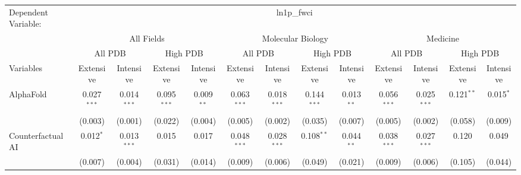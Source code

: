 \begingroup
\centering
\begin{tabular}{lcccccccccccc}
   \tabularnewline \midrule \midrule
   Dependent Variable: & \multicolumn{12}{c}{ln1p\_fwci}\\
 & \multicolumn{4}{c}{All Fields} & \multicolumn{4}{c}{Molecular Biology} & \multicolumn{4}{c}{Medicine} \\
\cmidrule(lr){2-5} \cmidrule(lr){6-9} \cmidrule(lr){10-13}
 & \multicolumn{2}{c}{All PDB} & \multicolumn{2}{c}{High PDB} & \multicolumn{2}{c}{All PDB} & \multicolumn{2}{c}{High PDB} & \multicolumn{2}{c}{All PDB} & \multicolumn{2}{c}{High PDB} \\
\cmidrule(lr){2-3} \cmidrule(lr){4-5} \cmidrule(lr){6-7} \cmidrule(lr){8-9} \cmidrule(lr){10-11} \cmidrule(lr){12-13}
Variables & \multicolumn{1}{c}{Extensive} & \multicolumn{1}{c}{Intensive} & \multicolumn{1}{c}{Extensive} & \multicolumn{1}{c}{Intensive} & \multicolumn{1}{c}{Extensive} & \multicolumn{1}{c}{Intensive} & \multicolumn{1}{c}{Extensive} & \multicolumn{1}{c}{Intensive} & \multicolumn{1}{c}{Extensive} & \multicolumn{1}{c}{Intensive} & \multicolumn{1}{c}{Extensive} & \multicolumn{1}{c}{Intensive} \\
\cmidrule(lr){1-1}\cmidrule(lr){2-2} \cmidrule(lr){3-3} \cmidrule(lr){4-4} \cmidrule(lr){5-5} \cmidrule(lr){6-6} \cmidrule(lr){7-7} \cmidrule(lr){8-8} \cmidrule(lr){9-9} \cmidrule(lr){10-10} \cmidrule(lr){11-11} \cmidrule(lr){12-12} \cmidrule(lr){13-13}
   AlphaFold                                & 0.027$^{***}$ & 0.014$^{***}$   & 0.095$^{***}$ & 0.009$^{**}$    & 0.063$^{***}$ & 0.018$^{***}$   & 0.144$^{***}$ & 0.013$^{**}$   & 0.056$^{***}$ & 0.025$^{***}$   & 0.121$^{**}$ & 0.015$^{*}$\\   
                                            & (0.003)       & (0.001)         & (0.022)       & (0.004)         & (0.005)       & (0.002)         & (0.035)       & (0.007)        & (0.005)       & (0.002)         & (0.058)      & (0.009)\\   
   Counterfactual AI                        & 0.012$^{*}$   & 0.013$^{***}$   & 0.015         & 0.017           & 0.048$^{***}$ & 0.028$^{***}$   & 0.108$^{**}$  & 0.044$^{**}$   & 0.038$^{***}$ & 0.027$^{***}$   & 0.120        & 0.049\\   
                                            & (0.007)       & (0.004)         & (0.031)       & (0.014)         & (0.009)       & (0.006)         & (0.049)       & (0.021)        & (0.009)       & (0.006)         & (0.105)      & (0.044)\\   

\end{tabular}
